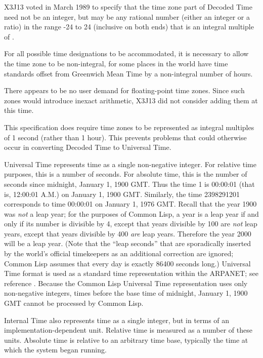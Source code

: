 \begin{newer}
X3J13 voted in March 1989 
to specify that the time zone part of Decoded Time need not be an integer,
but may be any rational number (either an integer or a ratio)
in the range -24 to 24 (inclusive on both ends)
that is an integral multiple of .

\beforenoterule
\begin{rationale}
For all possible time designations to be accommodated, it is
    necessary to allow the time zone to be non-integral, for some places
    in the world have time standards offset from Greenwich Mean Time
    by a non-integral number of hours.

    There appears to be no user demand for floating-point time zones.  Since such
    zones would introduce inexact arithmetic, X3J13 did not consider
    adding them at this time.

This specification does require time zones to be represented as integral multiples
    of 1 second (rather than 1 hour).  This prevents problems that could otherwise
occur in converting Decoded Time to Universal Time.
\end{rationale}
\afternoterule
\end{newer}

Universal Time represents time as a single non-negative integer.
For relative time
purposes, this is a number of seconds.  For absolute time, this is the
number of seconds since midnight, January 1, 1900 {GMT}.  Thus the time 1
is 00:00:01 (that is, 12:00:01 A.M.) on January 1, 1900 {GMT}.
Similarly, the time 2398291201 corresponds to time 00:00:01 on January 1,
1976 {GMT}.
Recall that the year 1900 was {\it not} a leap year; for the purposes of
Common Lisp, a year is a leap year if and only if its number is divisible by 4, except
that years divisible by 100 are {\it not} leap years, except that years
divisible by 400 {\it are} leap years.  Therefore the year 2000 will
be a leap year.
(Note that the ``leap seconds'' that
are sporadically inserted by the world's official timekeepers as an additional
correction are ignored; Common Lisp assumes that every day is exactly 86400
seconds long.)
Universal Time format is used as a standard time
representation within the {ARPANET}; see reference \cite{KLH-TIME-SERVER}.
Because the Common Lisp Universal Time representation uses only
non-negative integers, times before the base time of midnight,
January 1, 1900 {GMT} cannot be processed by Common Lisp.

Internal Time also represents time as a single integer, but
in terms of an implementation-dependent unit.
Relative time is measured as a number of these units.
Absolute time is relative to an arbitrary time base, typically
the time at which the system began running.

